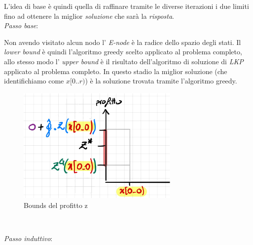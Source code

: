 \documentclass[a4paper]{article}
\begin{document}
L'idea di base è quindi quella di raffinare tramite le diverse iterazioni i due limiti fino ad ottenere la miglior \emph{soluzione} che sarà la \emph{risposta}.\\
\textit{Passo base}:
\begin{adjustwidth}{.8cm}{0cm}
		Non avendo visitato alcun nodo l' \textit{E-node} è la radice dello spazio degli stati.
		Il \textit{lower bound} è quindi l'algoritmo greedy scelto applicato al problema completo, allo stesso modo l' \textit{upper bound} è il risultato dell'algoritmo di soluzione di \emph{LKP} applicato al problema completo.
		In questo stadio la miglior soluzione (che identifichiamo come $x[0..r)$) è la soluzione trovata tramite l'algoritmo greedy.
\begin{figure}[!ht]
\centering
\includegraphics[width=0.7\textwidth]{./img/C14_profitto_z.png}
\caption{Bounds del profitto z} \label{FIG:C14_profitto_z}
\end{figure}\\
\end{adjustwidth}
\textit{Passo induttivo}:
\end{document}

